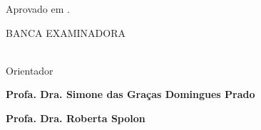 
%
% 
%
\begin{folhadeaprovacao}
	\begin{center}
		{\ImprimirAutor}

		\vspace*{\fill}\vspace*{\fill}
		\begin{center}
			\bfseries\large\ImprimirTitulo
		\end{center}
		\vspace*{\fill}

		\hspace{.45\textwidth}
		\begin{minipage}{.5\textwidth}
			\imprimirpreambulo
		\end{minipage}%
		\vspace*{\fill}
	\end{center}

	Aprovado em .

	\vspace*{\fill}
	\begin{center}
		\uppercase{Banca examinadora}

		\vspace*{\fill}

		\textbf{\imprimirorientador} \\
		Orientador \\
		\imprimirinstituicao

		\vspace*{\fill}

		\textbf{Profa. Dra. Simone das Graças Domingues Prado} \\
		\imprimirinstituicao

		\vspace*{\fill}

		\textbf{Profa. Dra. Roberta Spolon} \\
		\imprimirinstituicao

	\end{center}

	\vspace*{\fill}
\end{folhadeaprovacao}
